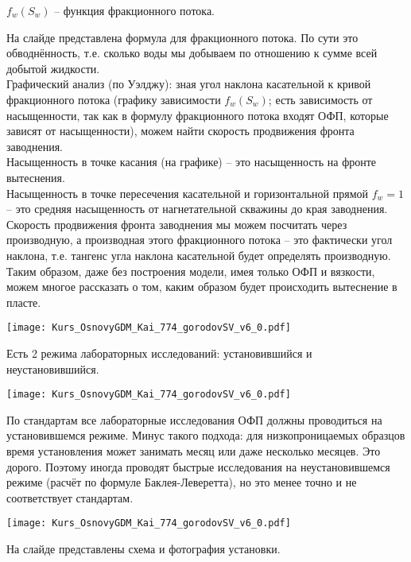 \documentclass[main.tex]{subfiles}
\begin{document}
$f_w(S_w)$ -- функция фракционного потока.

На слайде представлена формула для фракционного потока.
По сути это обводнённость, т.е. сколько воды мы добываем по отношению к сумме всей добытой жидкости.
\\

Графический анализ (по Уэлджу): зная угол наклона касательной к кривой фракционного потока (графику зависимости $f_w(S_w)$; есть зависимость от насыщенности, так как в формулу фракционного потока входят ОФП, которые зависят от насыщенности), можем найти скорость продвижения фронта заводнения.
\\

Насыщенность в точке касания (на графике) -- это насыщенность на фронте вытеснения.
\\

Насыщенность в точке пересечения касательной и горизонтальной прямой $f_w=1$ -- это средняя насыщенность от нагнетательной скважины до края заводнения.
\\

Скорость продвижения фронта заводнения мы можем посчитать через производную, а производная этого фракционного потока -- это фактически угол наклона, т.е. тангенс угла наклона касательной будет определять производную.
\\

Таким образом, даже без построения модели, имея только ОФП и вязкости, можем многое рассказать о том, каким образом будет происходить вытеснение в пласте.

\texttt{[image: Kurs\_OsnovyGDM\_Kai\_774\_gorodovSV\_v6\_0.pdf]}

Есть 2 режима лабораторных исследований: установившийся и неустановившийся.

\texttt{[image: Kurs\_OsnovyGDM\_Kai\_774\_gorodovSV\_v6\_0.pdf]}

По стандартам все лабораторные исследования ОФП должны проводиться на установившемся режиме.
Минус такого подхода: для низкопроницаемых образцов время установления может занимать месяц или даже несколько месяцев.
Это дорого.
Поэтому иногда проводят быстрые исследования на неустановившемся режиме (расчёт по формуле Баклея-Леверетта), но это менее точно и не соответствует стандартам.

\texttt{[image: Kurs\_OsnovyGDM\_Kai\_774\_gorodovSV\_v6\_0.pdf]}

На слайде представлены схема и фотография установки.
\end{document}

